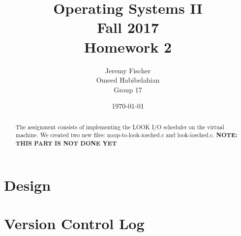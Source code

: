 \documentclass[draftclsnofoot, onecolumn, 10pt, compsoc]{IEEEtran}
\title{\textbf{Operating Systems II}\\Fall 2017\\Homework 2}
\author{Jeremy Fischer\\Omeed Habibelahian\\Group 17}
\date{\today}
\begin{document}
	\maketitle
	\begin{abstract}
		The assignment consists of implementing the LOOK I/O scheduler on the virtual machine. We created two new files: noop-to-look-iosched.c and look-iosched.c. \textbf{NOTE: THIS PART IS NOT DONE YET}
	\end{abstract}
	\newpage
	
	\section{Design}
	
	\section{Version Control Log}
\end{document}
